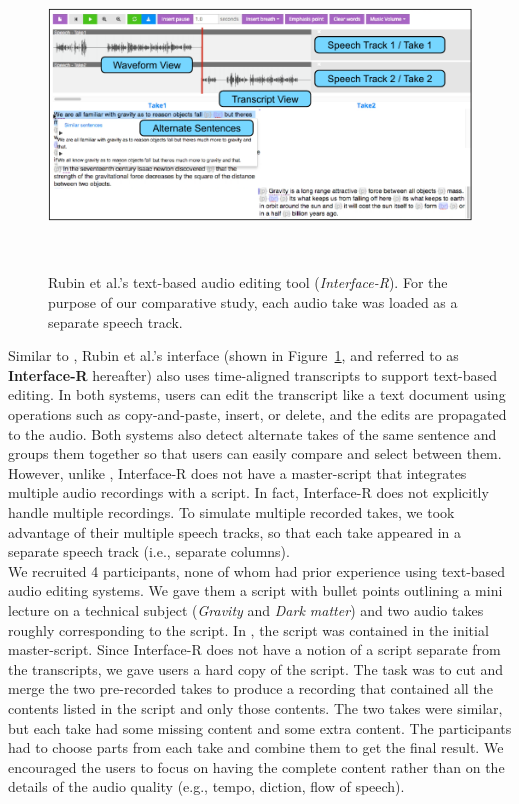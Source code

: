 \begin{figure}[!h]
\centering
  \includegraphics[width=1.0\columnwidth]{figures/interfaceR.pdf}
  \caption{Rubin et al.'s text-based audio editing tool (\textit{Interface-R}). For the purpose of our comparative study, each audio take was loaded as a separate speech track.}~\label{fig:interface-r}
\end{figure}

Similar to \voicescript , Rubin et al.'s interface (shown in Figure~\ref{fig:interface-r}, and referred to as
\textbf{Interface-R} hereafter) also uses time-aligned transcripts to support text-based editing. In both systems, users
can edit the transcript like a text document using operations
such as copy-and-paste, insert, or delete, and the edits are propagated
to the audio. Both systems also detect alternate takes of the
same sentence and groups them together so that users can easily compare and select between them.
However, unlike \voicescript , Interface-R does not have a master-script that integrates multiple audio recordings with a script. In fact, Interface-R does not explicitly handle multiple recordings. To simulate
multiple recorded takes, we took advantage of their multiple speech tracks,
so that each take appeared in a separate speech track (i.e., separate columns).\\

We recruited 4 participants, none of whom had
prior experience using text-based audio editing systems. We gave them
a script with bullet points outlining a mini lecture on a technical
subject (\textit{Gravity} and \textit{Dark matter}) and
two audio takes roughly corresponding to the script. In \voicescript , the script was contained in the initial master-script. Since Interface-R does not have a notion of
a script separate from the transcripts, we gave users a hard copy
of the script. The task
was to cut and merge the two pre-recorded takes to produce a recording that
contained all the contents listed in the script and only those
contents. The two takes were similar, but each take had some
missing content and some extra
content. The participants had to choose parts from each take
and combine them to get the final result. We encouraged the users
to focus on having the complete content rather than on the details
of the audio quality (e.g., tempo, diction, flow of speech).\\

